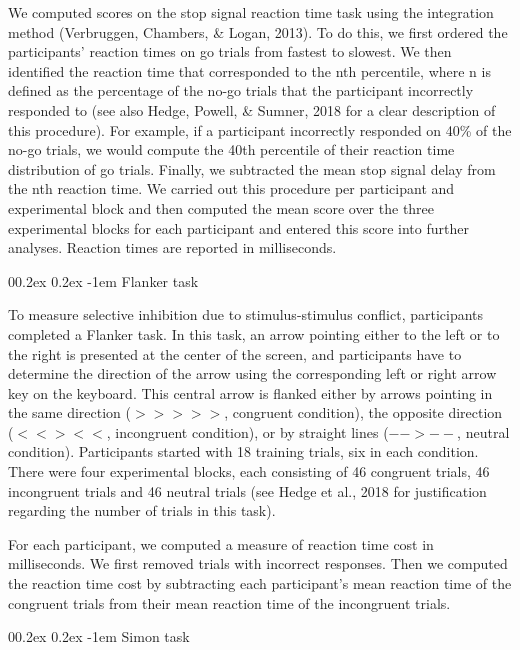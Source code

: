 \documentclass[
  man,floatsintext]{apa6}
\makeatletter
\let\oldparagraph\paragraph
\renewcommand{\paragraph}[1]{\oldparagraph{#1}\mbox{}}
\renewcommand{\paragraph}{\@startsection{paragraph}{4}{\parindent}%
  {0\baselineskip \@plus 0.2ex \@minus 0.2ex}%
  {-1em}%
  {\normalfont\normalsize\bfseries\itshape\typesectitle}}
\makeatother
\begin{document}
We computed scores on the stop signal reaction time task using the integration method (Verbruggen, Chambers, \& Logan, 2013). To do this, we first ordered the participants' reaction times on go trials from fastest to slowest. We then identified the reaction time that corresponded to the nth percentile, where n is defined as the percentage of the no-go trials that the participant incorrectly responded to (see also Hedge, Powell, \& Sumner, 2018 for a clear description of this procedure). For example, if a participant incorrectly responded on 40\% of the no-go trials, we would compute the 40th percentile of their reaction time distribution of go trials. Finally, we subtracted the mean stop signal delay from the nth reaction time. We carried out this procedure per participant and experimental block and then computed the mean score over the three experimental blocks for each participant and entered this score into further analyses. Reaction times are reported in milliseconds.

\hypertarget{flanker-task}{%
\paragraph{Flanker task}\label{flanker-task}}

To measure selective inhibition due to stimulus-stimulus conflict, participants completed a Flanker task. In this task, an arrow pointing either to the left or to the right is presented at the center of the screen, and participants have to determine the direction of the arrow using the corresponding left or right arrow key on the keyboard. This central arrow is flanked either by arrows pointing in the same direction (\(>>>>>\), congruent condition), the opposite direction (\(<<><<\), incongruent condition), or by straight lines (\(-->--\), neutral condition). Participants started with 18 training trials, six in each condition. There were four experimental blocks, each consisting of 46 congruent trials, 46 incongruent trials and 46 neutral trials (see Hedge et al., 2018 for justification regarding the number of trials in this task).

For each participant, we computed a measure of reaction time cost in milliseconds. We first removed trials with incorrect responses. Then we computed the reaction time cost by subtracting each participant's mean reaction time of the congruent trials from their mean reaction time of the incongruent trials.

\hypertarget{simon-task}{%
\paragraph{Simon task}\label{simon-task}}
\end{document}
